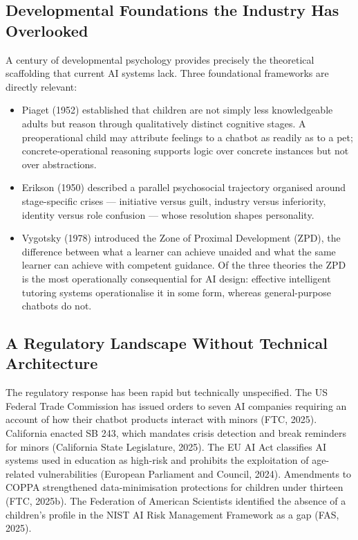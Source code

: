\documentclass[fleqn,10pt]{wlscirep}
\begin{document}
\subsection*{Developmental Foundations the Industry Has Overlooked}

A century of developmental psychology provides precisely the theoretical scaffolding that current AI systems lack. Three foundational frameworks are directly relevant:

\begin{itemize}
\item Piaget (1952)\cite{Piaget1952} established that children are not simply less knowledgeable adults but reason through qualitatively distinct cognitive stages. A preoperational child may attribute feelings to a chatbot as readily as to a pet; concrete-operational reasoning supports logic over concrete instances but not over abstractions.
\item Erikson (1950)\cite{Erikson1950} described a parallel psychosocial trajectory organised around stage-specific crises --- initiative versus guilt, industry versus inferiority, identity versus role confusion --- whose resolution shapes personality.
\item Vygotsky (1978)\cite{Vygotsky1978} introduced the Zone of Proximal Development (ZPD), the difference between what a learner can achieve unaided and what the same learner can achieve with competent guidance. Of the three theories the ZPD is the most operationally consequential for AI design: effective intelligent tutoring systems operationalise it in some form, whereas general-purpose chatbots do not.
\end{itemize}

\subsection*{A Regulatory Landscape Without Technical Architecture}

The regulatory response has been rapid but technically unspecified. The US Federal Trade Commission has issued orders to seven AI companies requiring an account of how their chatbot products interact with minors (FTC, 2025)\cite{FTC2025}. California enacted SB 243, which mandates crisis detection and break reminders for minors (California State Legislature, 2025)\cite{California2025}. The EU AI Act classifies AI systems used in education as high-risk and prohibits the exploitation of age-related vulnerabilities (European Parliament and Council, 2024)\cite{EUAI2024}. Amendments to COPPA strengthened data-minimisation protections for children under thirteen (FTC, 2025b)\cite{FTC2025b}. The Federation of American Scientists identified the absence of a children's profile in the NIST AI Risk Management Framework as a gap (FAS, 2025)\cite{FAS2025}.
\end{document}
